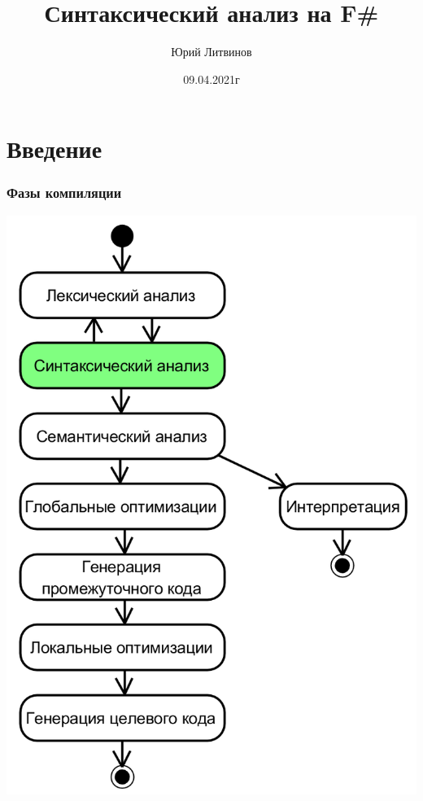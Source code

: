 \documentclass[xetex,mathserif,serif]{beamer}
\title{Синтаксический анализ на F\#}
\author{Юрий Литвинов}
\date{09.04.2021г}
\begin{document}
    
    \frame{\titlepage}

    \section{Введение}

    \begin{frame}
        \frametitle{Фазы компиляции}
        \begin{center}
            \includegraphics[height=0.8\textheight]{compilerPhases.png}
        \end{center}
    \end{frame}
\end{document}
